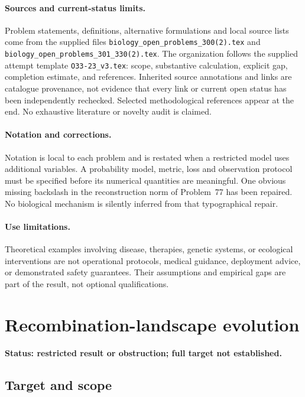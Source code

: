 \documentclass[11pt]{article}
\begin{document}
\paragraph{Sources and current-status limits.}
Problem statements, definitions, alternative formulations and local source lists
come from the supplied files
\texttt{biology\_open\_problems\_300(2).tex} and
\texttt{biology\_open\_problems\_301\_330(2).tex}.
The organization follows the supplied attempt template
\texttt{O33-23\_v3.tex}: scope, substantive calculation, explicit gap,
completion estimate, and references. Inherited source annotations and links are
catalogue provenance, not evidence that every link or current open status has
been independently rechecked. Selected methodological references appear at the
end. No exhaustive literature or novelty audit is claimed.

\paragraph{Notation and corrections.}
Notation is local to each problem and is restated when a restricted model uses
additional variables. A probability model, metric, loss and observation protocol
must be specified before its numerical quantities are meaningful. One obvious
missing backslash in the reconstruction norm of Problem~77 has been repaired.
No biological mechanism is silently inferred from that typographical repair.

\paragraph{Use limitations.}
Theoretical examples involving disease, therapies, genetic systems, or ecological
interventions are not operational protocols, medical guidance, deployment advice,
or demonstrated safety guarantees. Their assumptions and empirical gaps are part
of the result, not optional qualifications.


\section*{Recombination-landscape evolution}
\label{prob:170}
\noindent\textbf{Status: restricted result or obstruction; full target not established.}
\subsection{Target and scope}
\end{document}

